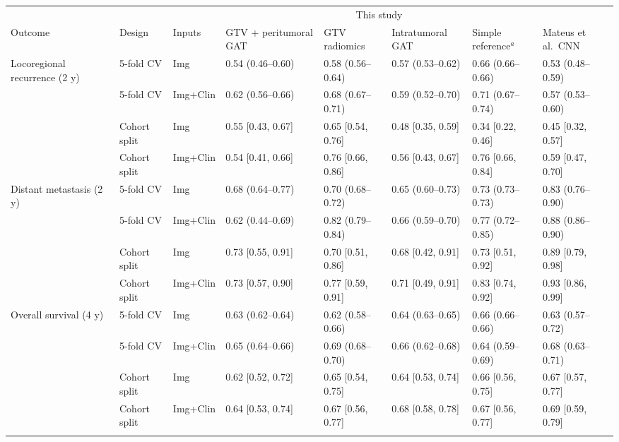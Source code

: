 \begin{tabular}{@{}llllllll@{}}
\toprule
 & & & \multicolumn{4}{c}{This study} & \\
\cmidrule(lr){4-7}
Outcome & Design & Inputs & GTV + peritumoral GAT & GTV radiomics & Intratumoral GAT & Simple reference$^{a}$ & Mateus et al.\ CNN \\
\midrule
Locoregional recurrence (2 y) & 5-fold CV & Img & 0.54 (0.46--0.60) & 0.58 (0.56--0.64) & 0.57 (0.53--0.62) & 0.66 (0.66--0.66) & 0.53 (0.48--0.59) \\
 & 5-fold CV & Img+Clin & 0.62 (0.56--0.66) & 0.68 (0.67--0.71) & 0.59 (0.52--0.70) & 0.71 (0.67--0.74) & 0.57 (0.53--0.60) \\
 & Cohort split & Img & 0.55 [0.43, 0.67] & 0.65 [0.54, 0.76] & 0.48 [0.35, 0.59] & 0.34 [0.22, 0.46] & 0.45 [0.32, 0.57] \\
 & Cohort split & Img+Clin & 0.54 [0.41, 0.66] & 0.76 [0.66, 0.86] & 0.56 [0.43, 0.67] & 0.76 [0.66, 0.84] & 0.59 [0.47, 0.70] \\
\midrule
Distant metastasis (2 y) & 5-fold CV & Img & 0.68 (0.64--0.77) & 0.70 (0.68--0.72) & 0.65 (0.60--0.73) & 0.73 (0.73--0.73) & 0.83 (0.76--0.90) \\
 & 5-fold CV & Img+Clin & 0.62 (0.44--0.69) & 0.82 (0.79--0.84) & 0.66 (0.59--0.70) & 0.77 (0.72--0.85) & 0.88 (0.86--0.90) \\
 & Cohort split & Img & 0.73 [0.55, 0.91] & 0.70 [0.51, 0.86] & 0.68 [0.42, 0.91] & 0.73 [0.51, 0.92] & 0.89 [0.79, 0.98] \\
 & Cohort split & Img+Clin & 0.73 [0.57, 0.90] & 0.77 [0.59, 0.91] & 0.71 [0.49, 0.91] & 0.83 [0.74, 0.92] & 0.93 [0.86, 0.99] \\
\midrule
Overall survival (4 y) & 5-fold CV & Img & 0.63 (0.62--0.64) & 0.62 (0.58--0.66) & 0.64 (0.63--0.65) & 0.66 (0.66--0.66) & 0.63 (0.57--0.72) \\
 & 5-fold CV & Img+Clin & 0.65 (0.64--0.66) & 0.69 (0.68--0.70) & 0.66 (0.62--0.68) & 0.64 (0.59--0.69) & 0.68 (0.63--0.71) \\
 & Cohort split & Img & 0.62 [0.52, 0.72] & 0.65 [0.54, 0.75] & 0.64 [0.53, 0.74] & 0.66 [0.56, 0.75] & 0.67 [0.57, 0.77] \\
 & Cohort split & Img+Clin & 0.64 [0.53, 0.74] & 0.67 [0.56, 0.77] & 0.68 [0.58, 0.78] & 0.67 [0.56, 0.77] & 0.69 [0.59, 0.79] \\
\botrule
\end{tabular}
